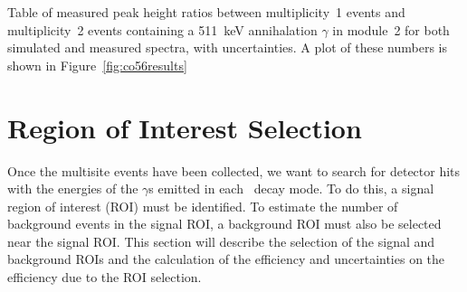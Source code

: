 \documentclass[/main.tex]{subfiles}
\begin{document}
\begin{table}[p]
  \caption[Table of peak height ratios for module~2]{\label{tab:co56resultsM2}
    Table of measured peak height ratios between multiplicity~1 events and multiplicity~2 events containing a 511~keV annihalation $\gamma$ in module~2 for both simulated and measured  spectra, with uncertainties. A plot of these numbers is shown in Figure~\ref{fig:co56results}
  }
  
\end{table}

\section{Region of Interest Selection}
Once the multisite events have been collected, we want to search for detector hits with the energies of the $\gamma$s emitted in each \bbes\ decay mode.
To do this, a signal region of interest (ROI) must be identified.
To estimate the number of background events in the signal ROI, a background ROI must also be selected near the signal ROI.
This section will describe the selection of the signal and background ROIs and the calculation of the efficiency and uncertainties on the efficiency due to the ROI selection.
\end{document}
